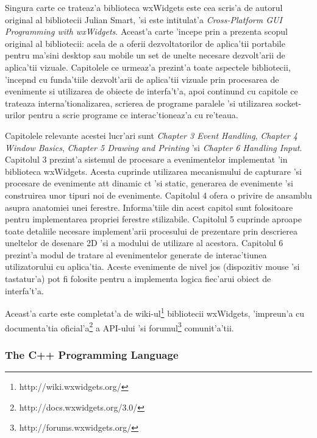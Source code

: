 \medskip

Singura carte ce trateaz'a biblioteca wxWidgets este cea scris'a de autorul original al bibliotecii Julian Smart, 'si este intitulat'a \emph{Cross-Platform GUI Programming with wxWidgets}\cite{wxwidgetsguide}. Aceast'a carte 'incepe prin a prezenta scopul original al bibliotecii: acela de a oferii dezvoltatorilor de aplica'tii portabile pentru ma'sini desktop sau mobile un set de unelte necesare dezvolt'arii de aplica'tii vizuale. Capitolele ce urmeaz'a prezint'a toate aspectele bibliotecii, 'incep{\ia}nd cu funda'tiile dezvolt'arii de aplica'tii vizuale prin procesarea de evenimente si utilizarea de obiecte de interfa't'a, apoi continu{\ia}nd cu capitole ce trateaza interna'tionalizarea, scrierea de programe paralele 'si utilizarea socket-urilor pentru a scrie programe ce interac'tioneaz'a cu re'teaua.

\medskip

Capitolele relevante acestei lucr'ari sunt \emph{Chapter 3 Event Handling}, \emph{Chapter 4 Window Basics}, \emph{Chapter 5 Drawing and Printing} 'si \emph{Chapter 6 Handling Input}. Capitolul 3 prezint'a sistemul de procesare a evenimentelor implementat 'in biblioteca wxWidgets. Acesta cuprinde utilizarea mecanismului de capturare 'si procesare de evenimente at{\ia}t dinamic c{\ia}t 'si static, generarea de evenimente 'si construirea unor tipuri noi de evenimente. Capitolul 4 ofera o privire de ansamblu asupra anatomiei unei ferestre. Informa'tiile din acest capitol sunt folositoare pentru implementarea propriei ferestre stilizabile. Capitolul 5 cuprinde aproape toate detaliile necesare implement'arii procesului de prezentare prin descrierea uneltelor de desenare 2D 'si a modului de utilizare al acestora. Capitolul 6 prezint'a modul de tratare al evenimentelor generate de interac'tiunea utilizatorului cu aplica'tia. Aceste evenimente de nivel jos (dispozitiv mouse 'si tastatur'a) pot fi folosite pentru a implementa logica fiec'arui obiect de interfa't'a.

Aceast'a carte este completat'a de wiki-ul\footnote{http://wiki.wxwidgets.org/} bibliotecii wxWidgets, 'impreun'a cu documenta'tia oficial'a\footnote{http://docs.wxwidgets.org/3.0/} a API-ului 'si forumul\footnote{http://forums.wxwidgets.org/} comunit'a'tii.

\subsubsection{The C++ Programming Language}

